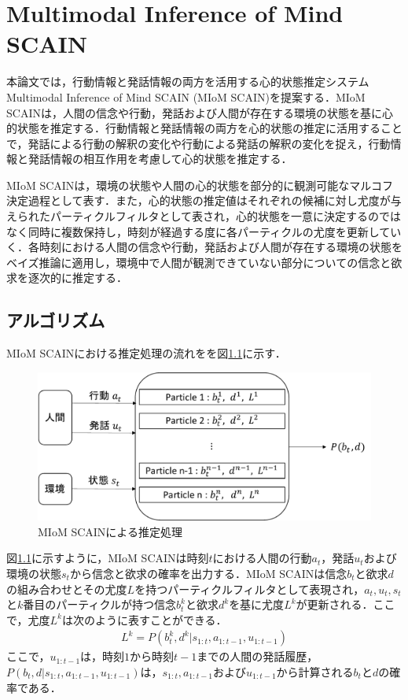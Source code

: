 \chapter{Multimodal Inference of Mind SCAIN}
\par
本論文では，行動情報と発話情報の両方を活用する心的状態推定システムMultimodal Inference of Mind SCAIN (MIoM SCAIN)を提案する．MIoM SCAINは，人間の信念や行動，発話および人間が存在する環境の状態を基に心的状態を推定する．行動情報と発話情報の両方を心的状態の推定に活用することで，発話による行動の解釈の変化や行動による発話の解釈の変化を捉え，行動情報と発話情報の相互作用を考慮して心的状態を推定する．

\par
MIoM SCAINは，環境の状態や人間の心的状態を部分的に観測可能なマルコフ決定過程として表す．また，心的状態の推定値はそれぞれの候補に対し尤度が与えられたパーティクルフィルタとして表され，心的状態を一意に決定するのではなく同時に複数保持し，時刻が経過する度に各パーティクルの尤度を更新していく．各時刻における人間の信念や行動，発話および人間が存在する環境の状態をベイズ推論に適用し，環境中で人間が観測できていない部分についての信念と欲求を逐次的に推定する．


\section{アルゴリズム}

\par
MIoM SCAINにおける推定処理の流れをを図\ref{fig:sys_arc}に示す．
\begin{figure}[htbp]
  \begin{center}
    \includegraphics[scale=0.75]{./bt1.pdf}
    \caption{MIoM SCAINによる推定処理}
    \label{fig:sys_arc}
  \end{center}
\end{figure}
図\ref{fig:sys_arc}に示すように，MIoM SCAINは時刻$t$における人間の行動$a_t$，発話$u_t$および環境の状態$s_t$から信念と欲求の確率を出力する．MIoM SCAINは信念$b_t$と欲求$d$の組み合わせとその尤度$L$を持つパーティクルフィルタとして表現され，$a_t,u_t,s_t$と$k$番目のパーティクルが持つ信念$b_t^k$と欲求$d^k$を基に尤度$L^k$が更新される．ここで，尤度$L^k$は次のように表すことができる．
\begin{equation}
  \begin{split}
  \label{pf}
  L^k=P(b_t^k,d^k|s_{1:t},a_{1:t-1},u_{1:t-1})
  \end{split}
\end{equation}
ここで，$u_{1:t-1}$は，時刻$1$から時刻$t-1$までの人間の発話履歴，$P(b_t,d|s_{1:t},a_{1:t-1},u_{1:t-1})$は，$s_{1:t},a_{1:t-1}およびu_{1:t-1}$から計算される$b_t$と$d$の確率である．

